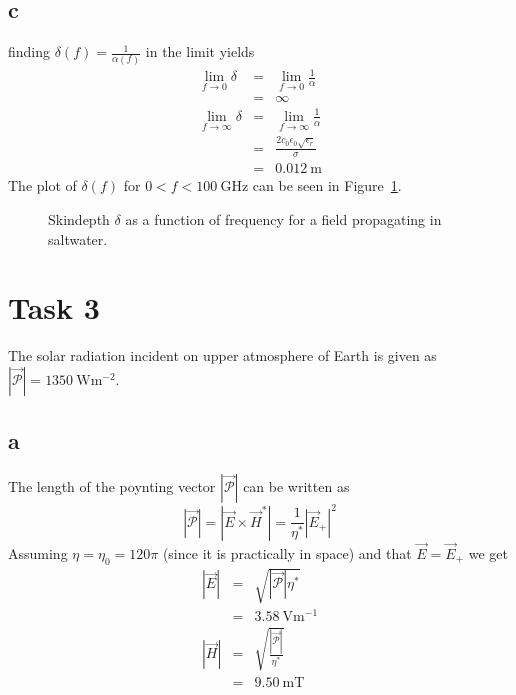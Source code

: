 \documentclass[12pt,a4paper]{article}
\begin{document}
\subsection{c}
finding $\delta(f)=\frac{1}{\alpha(f)}$ in the limit yields
\begin{equation}
  \begin{array}{lcl}
    \lim_{f\to 0}\delta & = & \lim_{f\to 0}\frac{1}{\alpha} \\
                            & = & \infty \\
    \lim_{f\to\infty}\delta & = & \lim_{f\to\infty}\frac{1}{\alpha} \\
                            & = & \frac{2c_0\epsilon_0\sqrt{\epsilon_r}}{\sigma} \\
     & = & \SI{0.012}{\metre}
  \end{array}
\end{equation}
The plot of $\delta(f)$ for $0<f<\SI{100}{\giga\hertz}$ can be seen in Figure~\ref{fig:skindepth}.
\begin{figure}\centering
  \scalebox{0.7}{}
  \caption{\label{fig:skindepth} Skindepth $\delta$ as a function of frequency for a field propagating in saltwater.}
\end{figure}

\section{Task 3}
The solar radiation incident on upper atmosphere of Earth is given as $|\vec{\mathcal{P}}|=\SI{1350}{\watt\metre^{-2}}$.
\subsection{a}
The length of the poynting vector $|\vec{\mathcal{P}}|$ can be written as
\begin{equation}
  |\vec{\mathcal{P}}| = |\vec{E}\times\vec{H}^*|=\frac{1}{\eta^*}|\vec{E}_+|^2
\end{equation}
Assuming $\eta=\eta_0=120\pi$ (since it is practically in space) and that $\vec{E}=\vec{E}_+$ we get
\begin{equation}
  \begin{array}{lcl}
    |\vec{E}| & = & \sqrt{|\vec{\mathcal{P}}|\eta^*} \\
              & = & \SI{3.58}{\volt\metre^{-1}} \\
    |\vec{H}| & = & \sqrt{\frac{|\vec{\mathcal{P}}|}{\eta^*}} \\
              & = & \SI{9.50}{\milli\tesla} \\
  \end{array}
\end{equation}
\end{document}
